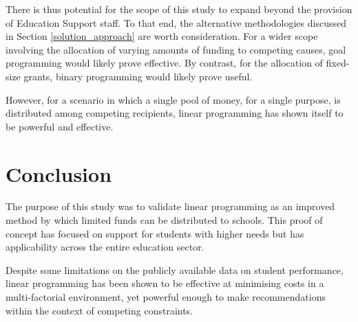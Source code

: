 \documentclass[11pt, a4paper]{article}
\begin{document}
    There is thus potential for the scope of this study to expand beyond the provision of Education Support staff. To that end, the alternative methodologies discussed in Section \ref{solution_approach} are worth consideration. For a wider scope involving the allocation of varying amounts of funding to competing causes, goal programming would likely prove effective. By contrast, for the allocation of fixed-size grants, binary programming would likely prove useful.

    However, for a scenario in which a single pool of money, for a single purpose, is distributed among competing recipients, linear programming has shown itself to be powerful and effective.

    \section{Conclusion}

    The purpose of this study was to validate linear programming as an improved method by which limited funds can be distributed to schools. This proof of concept has focused on support for students with higher needs but has applicability across the entire education sector. 

    Despite some limitations on the publicly available data on student performance, linear programming has been shown to be effective at minimising costs in a multi-factorial environment, yet powerful enough to make recommendations within the context of competing constraints. 

    \newpage

    \printbibliography 
\end{document}

